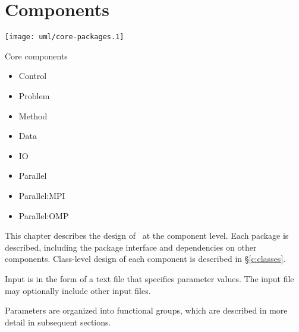 \chapter{Components} \label{s:components}

\centerline{\texttt{[image: uml/core-packages.1]}}

Core components

\begin{itemize}
\item Control
\item Problem
\item Method
\item Data
\item IO
\end{itemize}

\begin{itemize}
\item Parallel
\item Parallel:MPI
\item Parallel:OMP
\end{itemize}


   This chapter describes the design of \cello\ at the component
   level.  Each package is described, including the package interface and dependencies on other components.  Class-level design of each component is described in \S\ref{c:classes}.


Input is in the form of a text file that specifies
   parameter values.  The input file may optionally include other
   input files.

   Parameters are organized into functional groups, which are described
   in more detail in subsequent sections.

